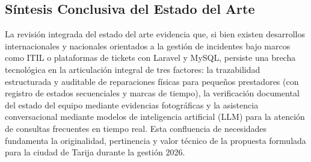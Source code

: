 \subsection{Síntesis Conclusiva del Estado del Arte}

La revisión integrada del estado del arte evidencia que, si bien existen desarrollos internacionales y nacionales orientados a la gestión de incidentes bajo marcos como ITIL o plataformas de tickets con Laravel y MySQL, persiste una brecha tecnológica en la articulación integral de tres factores: la trazabilidad estructurada y auditable de reparaciones físicas para pequeños prestadores (con registro de estados secuenciales y marcas de tiempo), la verificación documental del estado del equipo mediante evidencias fotográficas y la asistencia conversacional mediante modelos de inteligencia artificial (LLM) para la atención de consultas frecuentes en tiempo real. Esta confluencia de necesidades fundamenta la originalidad, pertinencia y valor técnico de la propuesta formulada para la ciudad de Tarija durante la gestión 2026.